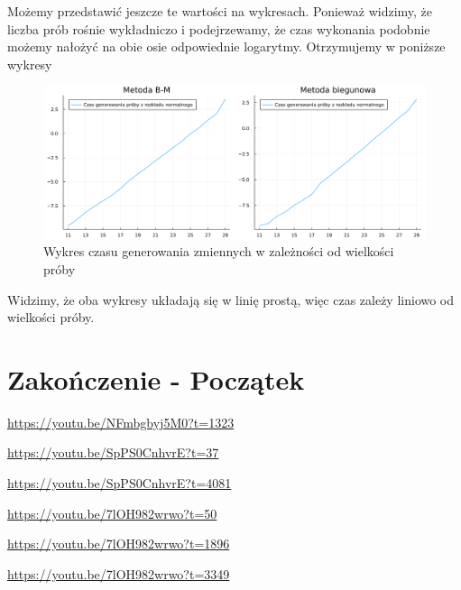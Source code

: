 \documentclass[12pt]{mwrep}
\begin{document}
	\noindent Możemy przedstawić jeszcze te wartości na wykresach. Ponieważ widzimy, że liczba prób rośnie wykładniczo i podejrzewamy, że czas wykonania podobnie możemy nałożyć na obie osie odpowiednie logarytmy. Otrzymujemy w poniższe wykresy
	\begin{figure}[H]\caption{Wykres czasu generowania zmiennych w zależności od wielkości próby}\label{fig:normal_time}
		\includegraphics[width=\columnwidth]{fig/fig_normal_time.png}
	\end{figure}
	\noindent Widzimy, że oba wykresy układają się w linię prostą, więc czas zależy liniowo od wielkości próby.

	
	\section{Zakończenie - Początek}
	
	
	\begin{thebibliography}{1}
		\url{https://youtu.be/NFmbgbyj5M0?t=1323}
		
		\url{https://youtu.be/SpPS0CnhvrE?t=37}
		
		\url{https://youtu.be/SpPS0CnhvrE?t=4081}
		
		\url{https://youtu.be/7lOH982wrwo?t=50}
		
		\url{https://youtu.be/7lOH982wrwo?t=1896}
		
		\url{https://youtu.be/7lOH982wrwo?t=3349}

	\end{thebibliography}
	
\end{document}
